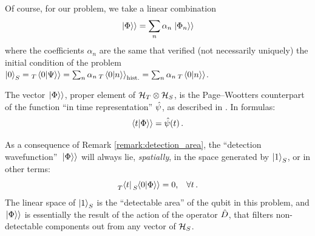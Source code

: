 Of course, for our problem, we take a linear combination
\begin{equation}
  \left.\left| \Phi \right\rangle\right\rangle = \sum_n \alpha_n \left.\left| \Phi_n \right\rangle\right\rangle
\end{equation}
where the coefficients $\alpha_n$ are the same that verified
(not necessarily uniquely)
the initial condition of the problem
$\ket{0}_S = {}_T\!\left.\left\langle 0 \middle| \Psi \right\rangle\right\rangle = \sum_n \alpha_n \, {}_T\!\left.\left\langle 0 \middle| n \right\rangle\right\rangle_{\text{hist.}} = \sum_n \alpha_n \, {}_T\!\left.\left\langle 0 \middle| n \right\rangle\right\rangle$.

\citereset
The vector $\left.\left| \Phi \right\rangle\right\rangle$, proper element of $\mathcal{H}_T \otimes \mathcal{H}_S$,
is the Page--Wootters counterpart of the function
``in time representation'' $\hat{\psi}$,
as
described in \cite{RuschhauptAbsorption}. In formulas:
\begin{equation}
  \!\left.\left\langle t \middle| \Phi \right\rangle\right\rangle = \hat{\psi}(t) \, \text{.}
\end{equation}

As a consequence of Remark \ref{remark:detection_area},
the ``detection wavefunction''~$\left.\left| \Phi \right\rangle\right\rangle$ will always lie,
\emph{spatially},
in the space generated by $\ket{1}_S$, or in other terms:
\begin{equation}\label{eq:detect_prob_ampl_only_on_1}
  \prescript{}{T}{\bra{t}}\prescript{}{S}{\!\left.\left\langle 0 \middle| \Phi \right\rangle\right\rangle} = 0 \text{,} \quad \forall t \, \text{.}
\end{equation}
The linear space of $\ket{1}_S$ is the ``detectable area'' of the qubit
in this problem, and
$\left.\left| \Phi \right\rangle\right\rangle$ is essentially the result of the action of the operator $\hat{D}$,
that filters non-detectable components out from any vector of $\mathcal{H}_S$.

